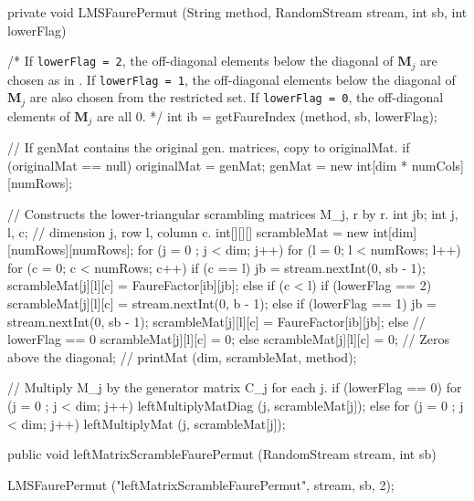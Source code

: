 \begin{code}\begin{hide}

   private void LMSFaurePermut (String method, RandomStream stream, int sb,
      int lowerFlag) {
/*
   If \texttt{lowerFlag = 2}, the off-diagonal elements below the diagonal
   of $\mathbf{M}_j$ are chosen as in .
   If \texttt{lowerFlag = 1}, the off-diagonal elements below the diagonal of
   $\mathbf{M}_j$ are also chosen from the restricted set. If
    \texttt{lowerFlag = 0}, the off-diagonal elements of $\mathbf{M}_j$ are all 0.
*/
      int ib = getFaureIndex (method, sb, lowerFlag);

      // If genMat contains the original gen. matrices, copy to originalMat.
      if (originalMat == null) {
         originalMat = genMat;
         genMat = new int[dim * numCols][numRows];
      }

      // Constructs the lower-triangular scrambling matrices M_j, r by r.
      int jb;
      int j, l, c;  // dimension j, row l, column c.
      int[][][] scrambleMat = new int[dim][numRows][numRows];
      for (j = 0 ; j < dim; j++) {
         for (l = 0; l < numRows; l++) {
            for (c = 0; c < numRows; c++) {
               if (c == l) {
                  jb = stream.nextInt(0, sb - 1);
                  scrambleMat[j][l][c] = FaureFactor[ib][jb];
               } else if (c < l) {
                  if (lowerFlag == 2) {
                     scrambleMat[j][l][c] = stream.nextInt(0, b - 1);
                  } else if (lowerFlag == 1) {
                     jb = stream.nextInt(0, sb - 1);
                     scrambleMat[j][l][c] = FaureFactor[ib][jb];
                  } else {   // lowerFlag == 0
                     scrambleMat[j][l][c] = 0;
                  }
               } else
                  scrambleMat[j][l][c] = 0;  // Zeros above the diagonal;
            }
         }
      }
      // printMat (dim, scrambleMat, method);

      // Multiply M_j by the generator matrix C_j for each j.
      if (lowerFlag == 0)
         for (j = 0 ; j < dim; j++) leftMultiplyMatDiag (j, scrambleMat[j]);
      else
         for (j = 0 ; j < dim; j++) leftMultiplyMat (j, scrambleMat[j]);
   }\end{hide}

   public void leftMatrixScrambleFaurePermut (RandomStream stream, int sb)\begin{hide} {
       LMSFaurePermut ("leftMatrixScrambleFaurePermut", stream, sb, 2);
   }\end{hide}
\end{code}
